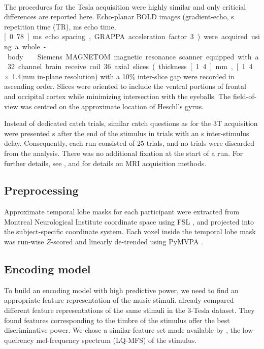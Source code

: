 \paragraph{\sevenT}
%
The procedures for the \unit[7]{Tesla} acquisition were highly similar and only
criticial differences are reported here. Echo-planar BOLD images
(gradient-echo, \unit[2]{s} repetition time (TR), \unit[22]{ms} echo time,
\unit[0.78]{ms} echo spacing, GRAPPA acceleration factor 3) were acquired using
a whole-body \sevenT\ Siemens MAGNETOM magnetic resonance scanner equipped with
a 32 channel brain receive coil. 36 axial slices (thickness \unit[1.4]{mm},
\unit[1.4 $\times$ 1.4]{mm} in-plane resolution) with a 10\% inter-slice gap
were recorded in ascending order.  Slices were oriented to include the ventral
portions of frontal and occipital cortex while minimizing intersection with the
eyeballs. The field-of-view was centred on the approximate location of Heschl's
gyrus.

Instead of dedicated catch trials, similar catch questions as for the 3T
acquisition were presented \unit[4]{s} after the end of the stimulus in trials
with an \unit[8]{s} inter-stimulus delay. Consequently, each run consisted of
25 trials, and no trials were discarded from the analysis.  There was no
additional fixation at the start of a run. For further details, see
\citet{HDH+2015}, and \citet{HBI+14} for details on MRI acquisition methods.


\subsection*{Preprocessing}

Approximate temporal lobe masks for each participant were extracted from
Montreal Neurological Institute coordinate space using FSL
\citep{SJB+04,JBB+12}, and projected into the subject-specific coordinate
system.  Each voxel inside the temporal lobe mask was run-wise $Z$-scored and
linearly de-trended using PyMVPA \citep{HHS09b}. 

\subsection*{Encoding model}

To build an encoding model with high predictive power, we need to find an
appropriate feature representation of the music stimuli.  \citet{CTK+2012}
already compared different feature representations of the same stimuli in the
3-Tesla dataset. They found features corresponding to the timbre of the
stimulus
offer the best discriminative power.  We chose a similar feature set made
available by \citet{HDH+2015}, the low-quefrency mel-frequency spectrum
(LQ-MFS) of the stimulus.

